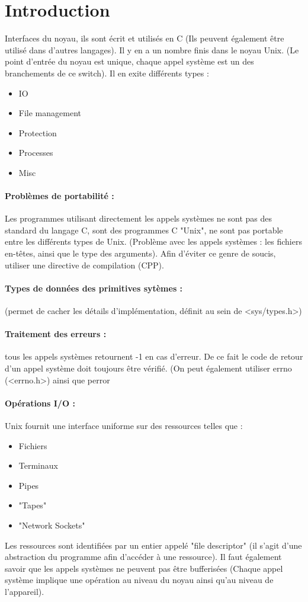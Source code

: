 \documentclass{article}[12pt]
\begin{document}


\tableofcontents%
\newpage
\section{Introduction}
Interfaces du noyau, ils sont écrit et utilisés en C (Ils peuvent également être utilisé dans d'autres langages). Il y en a un nombre finis dans le noyau Unix. (Le point d'entrée du noyau est unique, chaque appel système est un des branchements de ce switch). Il en exite différents types :
\begin{itemize}
	\item IO
    \item File management
    \item Protection
    \item Processes
    \item Misc
\end{itemize}
\paragraph{Problèmes de portabilité : } Les programmes utilisant directement les appels systèmes ne sont pas des standard du langage C, sont des programmes C "Unix", ne sont pas portable entre les différents types de Unix. (Problème avec les appels systèmes : les fichiers en-têtes, ainsi que le type des arguments). Afin d'éviter ce genre de soucis, utiliser une directive de compilation (CPP).
\paragraph{Types de données des primitives sytèmes : } (permet de cacher les détails d'implémentation, définit au sein de <sys/types.h>)
\paragraph{Traitement des erreurs :} tous les appels systèmes retournent -1 en cas d'erreur. De ce fait le code de retour d'un appel système doit toujours être vérifié. (On peut également utiliser errno (<errno.h>) ainsi que perror
\paragraph{Opérations I/O : } Unix fournit une interface uniforme sur des ressources telles que :
\begin{itemize}
	\item Fichiers
	\item Terminaux
	\item Pipes
	\item "Tapes"
	\item "Network Sockets"
\end{itemize}
Les ressources sont identifiées par un entier appelé "file descriptor" (il s'agit d'une abstraction du programme afin d'accéder à une ressource). Il faut également savoir que les appels systèmes ne peuvent pas être bufferisées (Chaque appel système implique une opération au niveau du noyau ainsi qu'au niveau de l'appareil).
\end{document}
